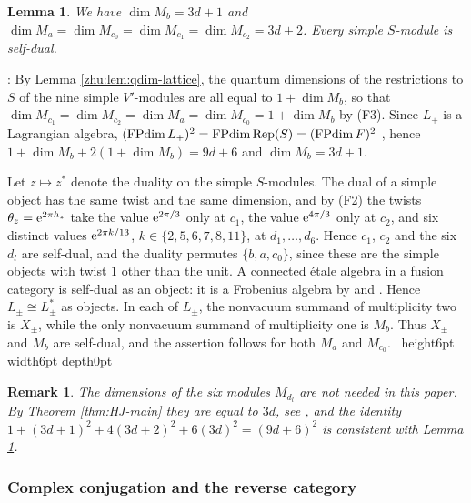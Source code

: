 \documentclass[leqno]{article}
\let\cal\relax
\newcommand{\cal}{\mathcal}
\newcommand{\qed}{\hfill \vrule height6pt  width6pt depth0pt}
\let\i\relax
\newcommand{\i}{\mathrm{i}}
\newcommand{\e}{\mathrm{e}}
\DeclareMathOperator{\Rep}{Rep}
\newtheorem{lemma}[thm]{Lemma}
\newtheorem{remark}[thm]{Remark}
\newenvironment{proof}[1][]{\noindent {\it Proof #1} : }{\hbox{~}\qed
\smallskip
}
\numberwithin{equation}{section}
\begin{document}
\begin{lemma}
\label{lem:dimensions}
We have $\dim M_b = 3d+1$ and $\dim M_a = \dim M_{c_0} = \dim M_{c_1} = \dim M_{c_2} = 3d+2$. Every simple $S$-module is self-dual.
\end{lemma}

\begin{proof}
By Lemma \ref{zhu:lem:qdim-lattice}, the quantum dimensions of the restrictions to $S$ of the nine simple $V'$-modules are all equal to $1+\dim M_b$, so that $\dim M_{c_1} = \dim M_{c_2} = \dim M_a = \dim M_{c_0} = 1+\dim M_b$ by (F3). Since $L_+$ is a Lagrangian algebra, $(\operatorname{FPdim} L_+)^2 = \operatorname{FPdim}\Rep(S) = (\operatorname{FPdim}\cal F)^2$ \cite[Corollary 3.32 and Section 4]{DMNO13}, hence $1+\dim M_b+2(1+\dim M_b) = 9d+6$ and $\dim M_b = 3d+1$.

Let $z \mapsto z^*$ denote the duality on the simple $S$-modules. The dual of a simple object has the same twist and the same dimension, and by (F2) the twists $\theta_z = \e^{2\pi\i h_z}$ take the value $\e^{2\pi\i/3}$ only at $c_1$, the value $\e^{4\pi\i/3}$ only at $c_2$, and six distinct values $\e^{2\pi\i k/13}$, $k \in \{2,5,6,7,8,11\}$, at $d_1, \ldots, d_6$. Hence $c_1$, $c_2$ and the six $d_l$ are self-dual, and the duality permutes $\{b,a,c_0\}$, since these are the simple objects with twist $1$ other than the unit. A connected étale algebra in a fusion category is self-dual as an object: it is a Frobenius algebra by \cite[Section 2.2]{DMNO13} and \cite[Remark 3.4]{DMNO13}. Hence $L_\pm \cong L_\pm^*$ as objects. In each of $L_\pm$, the nonvacuum summand of multiplicity two is $X_\pm$, while the only nonvacuum summand of multiplicity one is $M_b$. Thus $X_\pm$ and $M_b$ are self-dual, and the assertion follows for both $M_a$ and $M_{c_0}$.
\end{proof}

\begin{remark}\normalfont
\label{rem:d-dimensions}
The dimensions of the six modules $M_{d_l}$ are not needed in this paper. By Theorem \ref{thm:HJ-main} they are equal to $3d$, see \cite[Section 2.2]{ArhII}, and the identity $1 + (3d+1)^2 + 4(3d+2)^2 + 6(3d)^2 = (9d+6)^2$ is consistent with Lemma \ref{lem:dimensions}.
\end{remark}


\subsubsection{Complex conjugation and the reverse category}
\label{subsec:conjugation}
\end{document}

